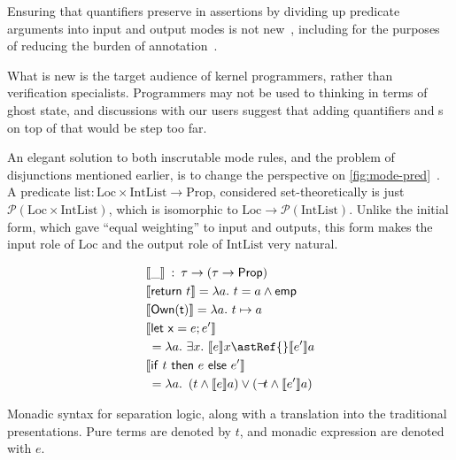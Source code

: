 Ensuring that quantifiers preserve  in assertions by
dividing up predicate arguments into input and output modes is
not new~,
including for the purposes of reducing the burden of
annotation~.

What is new is the target audience of kernel programmers, rather than
verification specialists. Programmers may not be used to thinking in terms of
ghost state, and discussions with our users suggest that adding quantifiers and
s on top of that would be step too far.

An elegant solution to both inscrutable mode rules, and the problem of
disjunctions mentioned earlier, is to change the perspective on
\cref{fig:mode-pred}~. A predicate
$\mathrm{list} : \mathrm{Loc} \times \mathrm{IntList} \rightarrow
\mathrm{Prop}$, considered set-theoretically is just $\mathcal{P} (\mathrm{Loc}
\times \mathrm{IntList})$, which is isomorphic to $\mathrm{Loc} \rightarrow
\mathcal{P} (\mathrm{IntList})$. Unlike the initial form, which gave ``equal
weighting'' to input and outputs, this form makes the input role of
$\mathrm{Loc}$ and the output role of $\mathrm{IntList}$ very natural.

\begin{marginfigure}
    \small%
    \begin{align*}
        &\llbracket \_ \rrbracket \::\: \tau \rightarrow (\tau \rightarrow \mathsf{Prop}) \\
        &\llbracket \mathsf{return}\ t \rrbracket = \lambda a.\ t = a \wedge{} \mathsf{emp} \\
        &\llbracket \mathsf{Own(t)} \rrbracket = \lambda a.\ t \mapsto{} a \\
        &\llbracket \mathsf{let\ x} = e; e' \rrbracket \\
        &\: = \lambda a.\ \exists x.\ \llbracket e \rrbracket x \astRef{} \llbracket e' \rrbracket a \\
        &\llbracket \mathsf{if}\ t\ \mathsf{then}\ e\ \mathsf{else}\ e' \rrbracket \\
        &\: = \lambda a.\  \left( t \wedge \llbracket e \rrbracket a \right) \vee \left( \neg \! t \wedge \llbracket e' \rrbracket a \right)
    \end{align*}
    \caption{Monadic syntax for separation logic, along with a translation into the traditional presentations. Pure
        terms are denoted by $t$, and monadic expression are denoted with $e$.}\label{fig:monad-sl}
\end{marginfigure}

